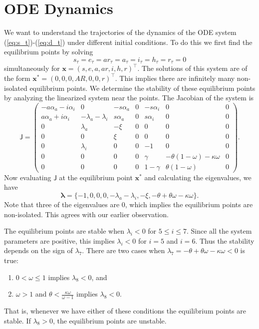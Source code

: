 \documentclass[11pt]{article}
\renewcommand\vec{\mathbf}
\newcommand{\mat}[1]{\mathsf{#1}}
\begin{document}
\section{ODE Dynamics}
	We want to understand the trajectories of the dynamics of the ODE system (\ref{eq:s_t})-(\ref{eq:d_t}) under different initial conditions.
	To do this we first find the equilibrium points by solving
	$$s_\tau = e_\tau = ar_\tau = a_\tau = i_\tau = h_\tau = r_\tau = 0$$
	simultaneously for $\vec{x} = (s, e, a, ar, i, h, r)^\intercal$.
	The solutions of this system are of the form $\vec{x^*} = (0, 0 , 0, AR, 0, 0, r)^\intercal$.
	This implies there are infinitely many non-isolated equilibrium points.
	We determine the stability of these equilibrium points by analyzing the linearized system near the points.
	The Jacobian of the system is
	\begin{equation}
		\mat{J} = \begin{pmatrix}
			- a \alpha_{a} - i \alpha_{i}		&	0						&	- s \alpha_{a}	&	0	&	- s \alpha_{i}	&	0										&	0	\\
			a \alpha_{a} + i \alpha_{i}			&	- \lambda_a - \lambda_i	&	s \alpha_{a}	&	0	&	s \alpha_{i}	&	0										&	0	\\
			0									&	\lambda_a				&	- \xi			&	0	&	0				&	0										&	0	\\
			0									&	0						&	\xi				&	0	&	0				&	0										&	0	\\
			0									&	\lambda_i				&	0				&	0	&	- 1				&	0										&	0	\\
			0									&	0						&	0				&	0	&		\gamma		&	- \theta (1 - \omega) - \kappa \omega	&	0	\\
			0									&	0						&	0				&	0	&	1 - \gamma		&	\theta (1 - \omega)						&	0
		\end{pmatrix}.
	\end{equation}
	Now evaluating $\mat{J}$ at the equilibrium point $\vec{x^*}$ and calculating the eigenvalues, we have
	\begin{equation}
		\vec{\lambda} = \{-1 , 0, 0, 0, - \lambda_a - \lambda_i , - \xi, - \theta + \theta \omega - \kappa \omega\}.
	\end{equation}
	Note that three of the eigenvalues are 0, which implies the equilibrium points are non-isolated.
	This agrees with our earlier observation.
	
	The equilibrium points are stable when $\lambda_i < 0$ for $5 \leq i \leq 7$.
	Since all the system parameters are positive, this implies $\lambda_i < 0$ for $i = 5$ and $i = 6$.
	Thus the stability depends on the sign of $\lambda_7$.
	There are two cases when $\lambda_7 = - \theta + \theta \omega - \kappa \omega < 0$ is true:
	\begin{enumerate}
		\item $0 < \omega \leq 1$ implies $\lambda_8 < 0$, and
		\item $\omega > 1$ and $\theta < \frac{\kappa \omega}{\omega - 1}$ implies $\lambda_8 < 0$.
	\end{enumerate}
	That is, whenever we have either of these conditions the equilibrium points are stable.
	If $\lambda_8 > 0$, the equilibrium points are unstable.
	
\end{document}
